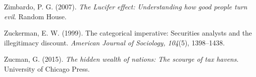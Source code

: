 \begin{thebibliography}{}
    Zimbardo, P. G. (2007). \textit{The Lucifer effect: Understanding how good people turn evil}. Random House.

    Zuckerman, E. W. (1999). The categorical imperative: Securities analysts and the illegitimacy discount. \textit{American Journal of Sociology, 104}(5), 1398–1438.

    Zucman, G. (2015). \textit{The hidden wealth of nations: The scourge of tax havens}. University of Chicago Press.

    
    
    
    
    
    
    
    
    
    
     
    
     
    

    
    
    
    
        
    
    
    
    

    
    
    
    
    
        

    
    
    
    
     
    
    
    
    
    
        
    
    
    
    
    
    
    
    
    
     
    
    
     


\end{thebibliography}